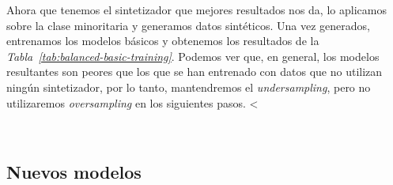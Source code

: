 Ahora que tenemos el sintetizador que mejores resultados nos da, lo aplicamos sobre la clase minoritaria y generamos datos sintéticos. Una vez generados, entrenamos los modelos básicos y obtenemos los resultados de la \textit{Tabla\ \ref{tab:balanced-basic-training}}. Podemos ver que, en general, los modelos resultantes son peores que los que se han entrenado con datos que no utilizan ningún sintetizador, por lo tanto, mantendremos el \textit{undersampling}, pero no utilizaremos \textit{oversampling} en los siguientes pasos.
<

\begin{table}[!ht]
    \centering
    \caption{Resultados de entrenar los modelos básicos habiendo balanceado el \textit{dataset}. Fuente propia.}\ \label{tab:balanced-basic-training}
\end{table}

\clearpage
\subsection{Nuevos modelos}

